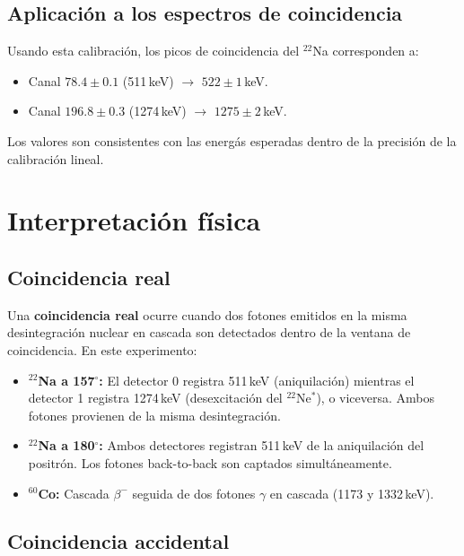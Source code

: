\documentclass[12pt,a4paper]{article}
\begin{document}
\subsection{Aplicaci\'on a los espectros de coincidencia}

Usando esta calibraci\'on, los picos de coincidencia del $^{22}$Na corresponden a:
\begin{itemize}
  \item Canal $78.4 \pm 0.1$ (511\,keV) $\rightarrow$ $522 \pm 1$\,keV.
  \item Canal $196.8 \pm 0.3$ (1274\,keV) $\rightarrow$ $1275 \pm 2$\,keV.
\end{itemize}
Los valores son consistentes con las energ\'as esperadas dentro de la precisi\'on
de la calibraci\'on lineal.

\section{Interpretaci\'on f\'isica}

\subsection{Coincidencia real}

Una \textbf{coincidencia real} ocurre cuando dos fotones emitidos en la misma desintegraci\'on
nuclear en cascada son detectados dentro de la ventana de coincidencia. En este experimento:
\begin{itemize}
  \item \textbf{$^{22}$Na a 157$^\circ$:} El detector 0 registra 511\,keV (aniquilaci\'on)
        mientras el detector 1 registra 1274\,keV (desexcitaci\'on del $^{22}$Ne$^*$),
        o viceversa. Ambos fotones provienen de la misma desintegraci\'on.
  \item \textbf{$^{22}$Na a 180$^\circ$:} Ambos detectores registran 511\,keV de la
        aniquilaci\'on del positr\'on. Los fotones back-to-back son captados simult\'aneamente.
  \item \textbf{$^{60}$Co:} Cascada $\beta^-$ seguida de dos fotones $\gamma$ en
        cascada (1173 y 1332\,keV).
\end{itemize}

\subsection{Coincidencia accidental}
\end{document}
